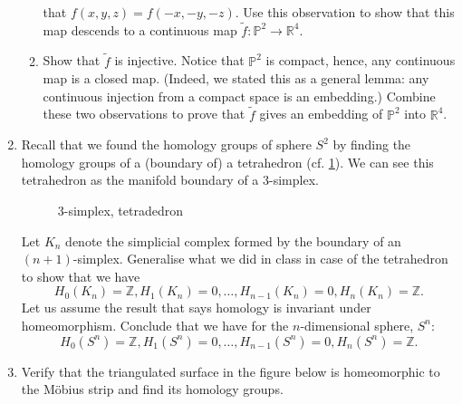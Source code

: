\documentclass[notoc,notitlepage]{tufte-book}
\begin{document}
\begin{enumerate}
\begin{enumerate}
        that $f(x, y, z) = f(-x, -y, -z)$. Use this observation to show that this map descends
        to a continuous map $\tilde{f} : \mathbb{P}^2 \to \mathbb{R}^4$.
      \item Show that $\tilde{f}$ is injective. Notice that $\mathbb{P}^2$ is compact, hence, any
        continuous map is a closed map. (Indeed, we stated this as a general lemma: any continuous
        injection from a compact space is an embedding.) Combine these two observations to prove
        that $\tilde{f}$ gives an embedding of $\mathbb{P}^2$ into $\mathbb{R}^4$.
    \end{enumerate}
  \item Recall that we found the homology groups of sphere $S^2$ by finding the
    homology groups of a (boundary of) a tetrahedron (cf. \cref{fig:_3_simplex_tetradedron}).
    We can see this tetrahedron as the manifold boundary of a $3$-simplex.
    \begin{figure}[ht]
      \centering
      \caption{$3$-simplex, tetradedron}
      \label{fig:_3_simplex_tetradedron}
    \end{figure}
    Let $K_n$ denote the simplicial complex formed by the boundary of an $(n + 1)$-simplex.
    Generalise what we did in class in case of the tetrahedron to show that we have
    \begin{equation*}
      H_0(K_n) = \mathbb{Z}, H_1(K_n) = 0, \ldots, H_{n - 1}(K_n) = 0, H_n(K_n) = \mathbb{Z}.
    \end{equation*}
    Let us assume the result that says homology is invariant under homeomorphism. Conclude that
    we have for the $n$-dimensional sphere, $S^n$:
    \begin{equation}
      H_0(S^n) = \mathbb{Z}, H_1(S^n) = 0, \ldots, H_{n - 1}(S^n) = 0, H_n(S^n) = \mathbb{Z}.
    \end{equation}
  \item Verify that the triangulated surface in the figure below is homeomorphic to the
    M\"{o}bius strip and find its homology groups.
    \begin{figure}[ht]
      \centering
\end{figure}
\end{enumerate}
\end{document}
